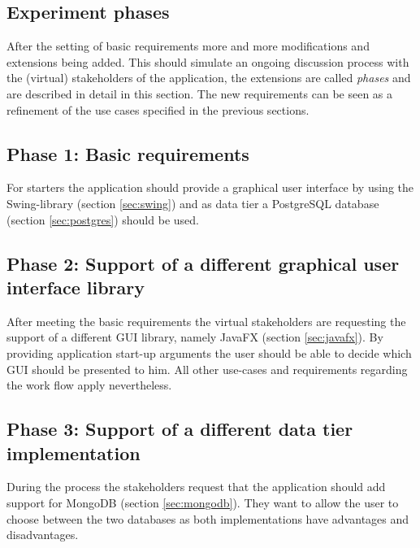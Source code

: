 \subsection{Experiment phases}
After the setting of basic requirements more and more modifications and extensions being added. This should simulate an ongoing discussion process with the (virtual) stakeholders of the application, the extensions are called \emph{phases} and are described in detail in this section. The new requirements can be seen as a refinement of the use cases specified in the previous sections.

\subsection{Phase 1: Basic requirements} 
For starters the application should provide a graphical user interface by using the Swing-library (section \ref{sec:swing}) and as data tier a PostgreSQL database (section \ref{sec:postgres}) should be used.

\subsection{Phase 2: Support of a different graphical user interface library}
After meeting the basic requirements the virtual stakeholders are requesting the support of a different GUI library, namely JavaFX (section \ref{sec:javafx}). By providing application start-up arguments the user should be able to decide which GUI should be presented to him. All other use-cases and requirements regarding the work flow apply nevertheless.

\subsection{Phase 3: Support of a different data tier implementation}
During the process the stakeholders request that the application should add support for MongoDB (section \ref{sec:mongodb}). They want to allow the user to choose between the two databases as both implementations have advantages and disadvantages. 


